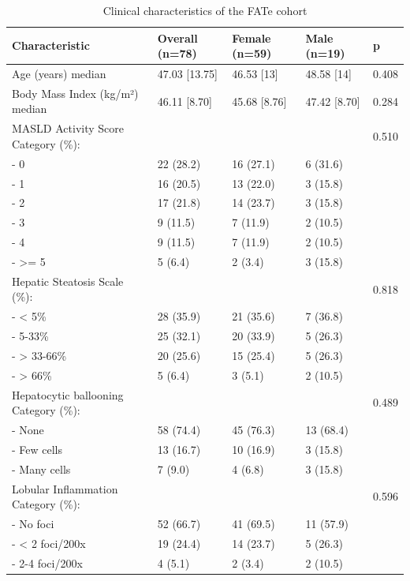 \documentclass[
  11pt,
  letterpaper,
]{book}
\begin{document}
\clearpage

\begingroup\fontsize{10.5}{12.5}\selectfont

\begin{longtable}{lllll}

\caption{\label{tbl-description}Clinical characteristics of the FATe
cohort}

\tabularnewline

\toprule
\textbf{Characteristic} & \textbf{Overall (n=78)} & \textbf{Female (n=59)} & \textbf{Male (n=19)} & \textbf{p}\\
\midrule
Age (years) median & 47.03 [13.75] & 46.53 [13] & 48.58 [14] & 0.408\\
Body Mass Index (kg/m²) median & 46.11 [8.70] & 45.68 [8.76] & 47.42 [8.70] & 0.284\\
MASLD Activity Score Category (\%): &  &  &  & 0.510\\
- 0 & 22 (28.2) & 16 (27.1) & 6 (31.6) & \\
- 1 & 16 (20.5) & 13 (22.0) & 3 (15.8) & \\
\addlinespace
- 2 & 17 (21.8) & 14 (23.7) & 3 (15.8) & \\
- 3 & 9 (11.5) & 7 (11.9) & 2 (10.5) & \\
- 4 & 9 (11.5) & 7 (11.9) & 2 (10.5) & \\
- >= 5 & 5 (6.4) & 2 (3.4) & 3 (15.8) & \\
Hepatic Steatosis Scale (\%): &  &  &  & 0.818\\
\addlinespace
- < 5\% & 28 (35.9) & 21 (35.6) & 7 (36.8) & \\
- 5-33\% & 25 (32.1) & 20 (33.9) & 5 (26.3) & \\
- > 33-66\% & 20 (25.6) & 15 (25.4) & 5 (26.3) & \\
- > 66\% & 5 (6.4) & 3 (5.1) & 2 (10.5) & \\
Hepatocytic ballooning Category (\%): &  &  &  & 0.489\\
\addlinespace
- None & 58 (74.4) & 45 (76.3) & 13 (68.4) & \\
- Few cells & 13 (16.7) & 10 (16.9) & 3 (15.8) & \\
- Many cells & 7 (9.0) & 4 (6.8) & 3 (15.8) & \\
Lobular Inflammation Category (\%): &  &  &  & 0.596\\
- No foci & 52 (66.7) & 41 (69.5) & 11 (57.9) & \\
\addlinespace
- < 2 foci/200x & 19 (24.4) & 14 (23.7) & 5 (26.3) & \\
- 2-4 foci/200x & 4 (5.1) & 2 (3.4) & 2 (10.5) & \\

\end{longtable}
\end{document}
